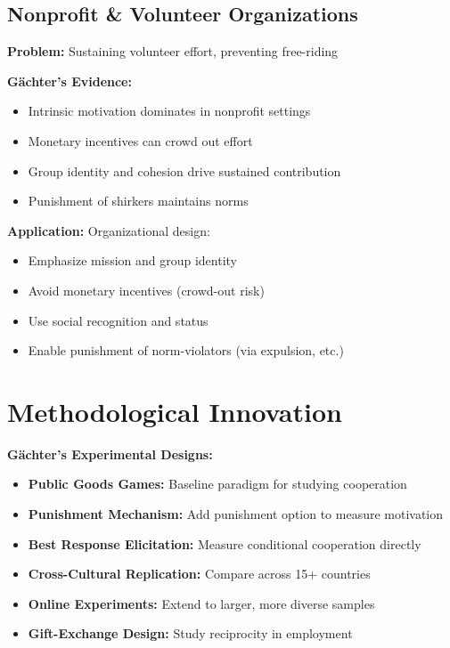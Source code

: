 \documentclass[11pt]{article}
\begin{document}
\subsection*{Nonprofit \& Volunteer Organizations}

\textbf{Problem:} Sustaining volunteer effort, preventing free-riding

\textbf{Gächter's Evidence:}
\begin{itemize}
    \item Intrinsic motivation dominates in nonprofit settings
    \item Monetary incentives can crowd out effort
    \item Group identity and cohesion drive sustained contribution
    \item Punishment of shirkers maintains norms
\end{itemize}

\textbf{Application:} Organizational design:
\begin{itemize}
    \item Emphasize mission and group identity
    \item Avoid monetary incentives (crowd-out risk)
    \item Use social recognition and status
    \item Enable punishment of norm-violators (via expulsion, etc.)
\end{itemize}

\section*{Methodological Innovation}

\textbf{Gächter's Experimental Designs:}

\begin{itemize}
    \item \textbf{Public Goods Games:} Baseline paradigm for studying cooperation
    \item \textbf{Punishment Mechanism:} Add punishment option to measure motivation
    \item \textbf{Best Response Elicitation:} Measure conditional cooperation directly
    \item \textbf{Cross-Cultural Replication:} Compare across 15+ countries
    \item \textbf{Online Experiments:} Extend to larger, more diverse samples
    \item \textbf{Gift-Exchange Design:} Study reciprocity in employment
\end{itemize}
\end{document}
